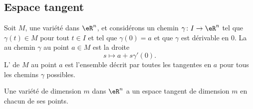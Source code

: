 \subsection{Espace tangent}

Soit $M$, une variété dans $\eR^n$, et considérons un chemin $\gamma\colon I\to \eR^n$ tel que $\gamma(t)\in M$ pour tout $t\in I$ et tel que $\gamma(0)=a$ et que $\gamma$ est dérivable en $0$. La  au chemin $\gamma$ au point $a\in M$ est la droite
\begin{equation}
	s\mapsto a+s\gamma'(0).
\end{equation}
L' de $M$ au point $a$ est l'ensemble décrit par toutes les tangentes en $a$ pour tous les chemins $\gamma$ possibles.

\begin{proposition}			\label{PropDimEspTanVarConst}
	Une variété de dimension $m$ dans $\eR^n$ a un espace tangent de dimension $m$ en chacun de ses points.
\end{proposition}

